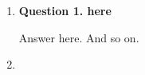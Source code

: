 \documentclass[11pt]{article}
\begin{document}
\begin{enumerate}
    \item \textbf{Question 1. here}

    Answer here. And so on.

    \item \textbf{}


\end{enumerate}
\end{document}
